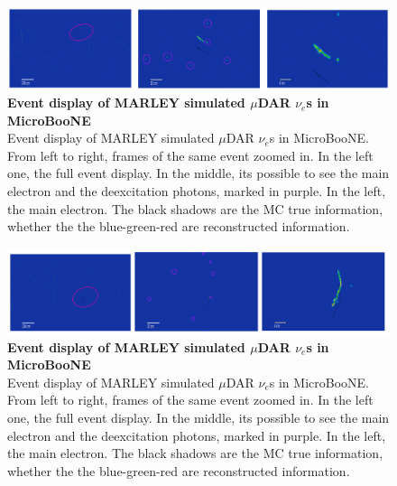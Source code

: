 \begin{figure}[h!]
    \centering
    \includegraphics[width=200mm]{Figures/signal_evd_1.jpeg}
    \caption[Event display of MARLEY simulated $\mu$DAR $\nu_e$s in MicroBooNE]{{\textbf{Event display of MARLEY simulated $\mu$DAR $\nu_e$s in MicroBooNE}}\\ Event display of MARLEY simulated $\mu$DAR $\nu_e$s in MicroBooNE. From left to right, frames of the same event zoomed in. In the left one, the full event display. In the middle, its possible to see the main electron and the deexcitation photons, marked in purple. In the left, the main electron. The black shadows are the MC true information, whether the the blue-green-red are reconstructed information.}
    \label{signal_evd_1}
\end{figure}

\begin{figure}[h!]
    \centering
    \includegraphics[width=200mm]{Figures/signal_evd_2.jpeg}
    \caption[Event display of MARLEY simulated $\mu$DAR $\nu_e$s in MicroBooNE]{{\textbf{Event display of MARLEY simulated $\mu$DAR $\nu_e$s in MicroBooNE}}\\ Event display of MARLEY simulated $\mu$DAR $\nu_e$s in MicroBooNE. From left to right, frames of the same event zoomed in. In the left one, the full event display. In the middle, its possible to see the main electron and the deexcitation photons, marked in purple. In the left, the main electron. The black shadows are the MC true information, whether the the blue-green-red are reconstructed information.}
    \label{signal_evd_2}
\end{figure}

